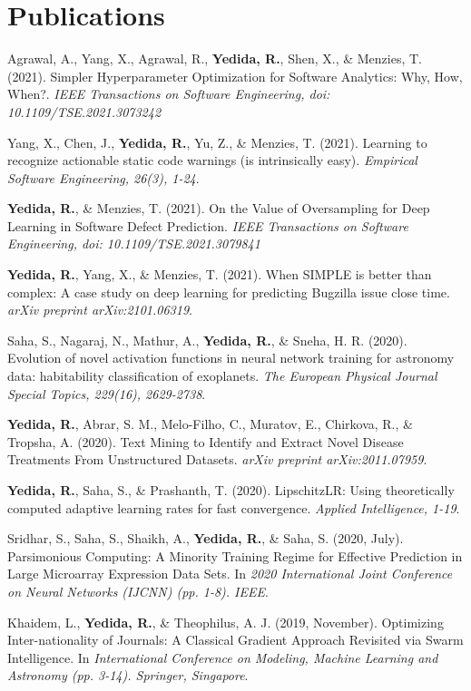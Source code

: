 \section{Publications}
 \resumeSubHeadingListStart
    \item
      {Agrawal, A., Yang, X., Agrawal, R., \textbf{Yedida, R.}, Shen, X., \& Menzies, T. (2021). Simpler Hyperparameter Optimization for Software Analytics: Why, How, When?. \textit{IEEE Transactions on Software Engineering, doi: 10.1109/TSE.2021.3073242}}
    \item
      {Yang, X., Chen, J., \textbf{Yedida, R.}, Yu, Z., \& Menzies, T. (2021). Learning to recognize actionable static code warnings (is intrinsically easy). \textit{Empirical Software Engineering, 26(3), 1-24}.}
    \item
      {\textbf{Yedida, R.}, \& Menzies, T. (2021). On the Value of Oversampling for Deep Learning in Software Defect Prediction. \textit{IEEE Transactions on Software Engineering, doi: 10.1109/TSE.2021.3079841}}
    \item
      {\textbf{Yedida, R.}, Yang, X., \& Menzies, T. (2021). When SIMPLE is better than complex: A case study on deep learning for predicting Bugzilla issue close time. \textit{arXiv preprint arXiv:2101.06319}.}
    \item
      {Saha, S., Nagaraj, N., Mathur, A., \textbf{Yedida, R.}, \& Sneha, H. R. (2020). Evolution of novel activation functions in neural network training for astronomy data: habitability classification of exoplanets. \textit{The European Physical Journal Special Topics, 229(16), 2629-2738}.}
    \item
      {\textbf{Yedida, R.}, Abrar, S. M., Melo-Filho, C., Muratov, E., Chirkova, R., \& Tropsha, A. (2020). Text Mining to Identify and Extract Novel Disease Treatments From Unstructured Datasets. \textit{arXiv preprint arXiv:2011.07959}.}
    \item
      {\textbf{Yedida, R.}, Saha, S., \& Prashanth, T. (2020). LipschitzLR: Using theoretically computed adaptive learning rates for fast convergence. \textit{Applied Intelligence, 1-19}.}
    \item
      {Sridhar, S., Saha, S., Shaikh, A., \textbf{Yedida, R.}, \& Saha, S. (2020, July). Parsimonious Computing: A Minority Training Regime for Effective Prediction in Large Microarray Expression Data Sets. In \textit{2020 International Joint Conference on Neural Networks (IJCNN) (pp. 1-8). IEEE}.}
    \item
      {Khaidem, L., \textbf{Yedida, R.}, \& Theophilus, A. J. (2019, November). Optimizing Inter-nationality of Journals: A Classical Gradient Approach Revisited via Swarm Intelligence. In \textit{International Conference on Modeling, Machine Learning and Astronomy (pp. 3-14). Springer, Singapore}.}
 \resumeSubHeadingListEnd